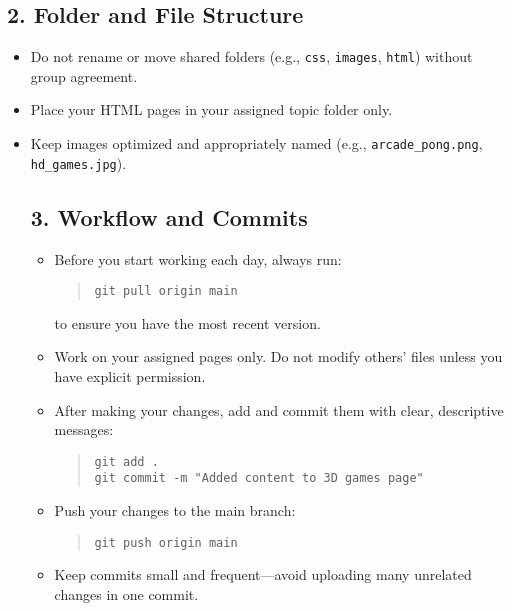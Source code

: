\documentclass[a4paper,12pt]{article}
\begin{document}
\subsection*{2. Folder and File Structure}
\begin{itemize}[leftmargin=1.2cm]
    \item Do not rename or move shared folders (e.g., \texttt{css}, \texttt{images}, \texttt{html}) without group agreement.
    \item Place your HTML pages in your assigned topic folder only.
    \item Keep images optimized and appropriately named (e.g., \texttt{arcade\_pong.png}, \texttt{hd\_games.jpg}).

\vspace{0.3cm}
\subsection*{3. Workflow and Commits}
\begin{itemize}[leftmargin=1.2cm]
    \item Before you start working each day, always run:
    \begin{quote}
        \texttt{git pull origin main}
    \end{quote}
      to ensure you have the most recent version.
    \item Work on your assigned pages only. Do not modify others’ files unless you have explicit permission.
    \item After making your changes, add and commit them with clear, descriptive messages:
    \begin{quote}
        \texttt{git add .}\\
        \texttt{git commit -m "Added content to 3D games page"}
    \end{quote}
    \item Push your changes to the main branch:
    \begin{quote}
        \texttt{git push origin main}
    \end{quote}
    \item Keep commits small and frequent—avoid uploading many unrelated changes in one commit.
\end{itemize}

\vspace{0.3cm}

\end{itemize}
\end{document}

